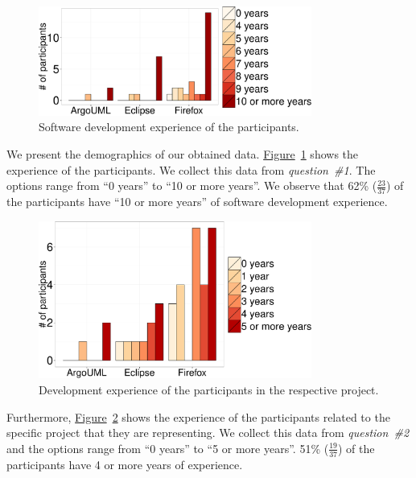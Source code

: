 \begin{figure}
	\centering
	\includegraphics[width=0.80\textwidth,keepaspectratio] 
	{chapters/chapter5/figures/demographic_experience.pdf}
	\caption{Software development experience of the participants.}
	\label{fig:demographics_experience}
\end{figure}
We present the demographics of our obtained data.
\hyperref[fig:demographics_experience]{Figure}~\ref{fig:demographics_experience}
shows the experience of the participants. We collect this data from {\em
question~\#1}. The options range from ``0 years'' to ``10 or more years''. We
observe that 62\% ($\frac{23}{37}$) of the participants have ``10 or more
years'' of software development experience. 
\begin{figure}
	\centering
	\includegraphics[width=0.80\textwidth,keepaspectratio] 
	{chapters/chapter5/figures/demographic_experience_project.pdf}
	\caption{Development experience of the participants in the
	respective project.}
	\label{fig:demographics_experience_project}
\end{figure}
Furthermore,
\hyperref[fig:demographics_experience_project]{Figure}~\ref{fig:demographics_experience_project}
shows the experience of the participants related to the specific project that
they are representing. We collect this data from {\em question~\#2} and the
options range from ``0 years'' to ``5 or more years''. 51\%  ($\frac{19}{37}$)
of the participants have 4 or more years of experience. 
